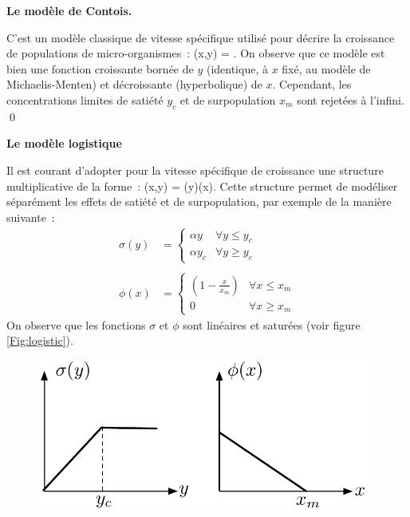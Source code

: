\begin{exemple}{\bf Le modèle de Contois.}

C'est un modèle classique de vitesse spécifique utilisé
pour décrire la croissance de populations de micro-organismes~:
\eqnn
\mu(x,y) = .
\eeqnn
On observe que ce modèle est bien une fonction croissante bornée de $y$
(identique, à $x$ fixé, au modèle de Michaelis-Menten) et
décroissante (hyperbolique) de $x$. Cependant, les concentrations limites
de satiété $y_{c}$ et de surpopulation $x_{m}$ sont rejetées à l'infini.  \qed
\end{exemple}

\begin{exemple}{\bf Le modèle logistique}

Il est courant d'adopter pour la vitesse spécifique de croissance une
structure multiplicative de la forme~:
\eqnn
\mu(x,y) = \sigma(y)\phi(x).
\eeqnn
Cette structure permet de modéliser séparément les effets de satiété et
de surpopulation, par exemple de la manière suivante~:
\begin{equation*} \begin{split} \sigma(y) &= \left\{\begin{array}{ll}
\alpha y & \forall y \leq y_{c} \\ \alpha y_{c} & \forall y \geq y_{c} \end{array} \right.\\ \\
\phi(x) &= 
\left\{ \begin{array}{ll} (1 - \frac{x}{x_{m}}) & \forall x \leq x_{m} \\ 0  & \forall x \geq x_{m}
\end{array} \right.
\end{split} \end{equation*}
On observe que les fonctions $\sigma$ et $\phi$ sont linéaires et
saturées (voir figure  \ref{Fig:logistic}).
\begin{figure}[htbp] 
   \centering
   \includegraphics[height=5cm]{logistic} 

\end{figure}
\end{exemple}
